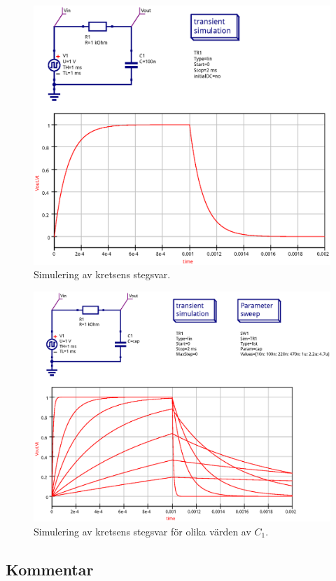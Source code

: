 \begin{figure}[ht]
    \centering
    \includegraphics[width=\linewidth]{sim/ee466_lab-4_prj/uppgift-2_step}
    \caption[] {Simulering av kretsens stegsvar.}
    \label{fig:step-sim-step}
\end{figure}

\begin{figure}[ht]
    \centering
    \includegraphics[width=\linewidth]{sim/ee466_lab-4_prj/uppgift-2_param}
    \caption[] {Simulering av kretsens stegsvar för olika värden av $C_1$.}
    \label{fig:step-sim-param}
\end{figure}


\subsection{Kommentar}\label{}

